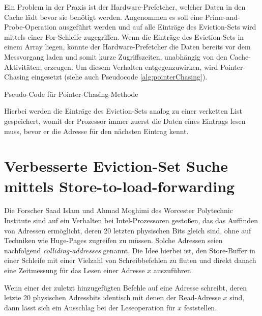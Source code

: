 Ein Problem in der Praxis ist der Hardware-Prefetcher, welcher Daten in den Cache lädt bevor sie benötigt werden.
Angenommen es soll eine Prime-and-Probe-Operation ausgeführt werden und auf alle Einträge des Eviction-Sets wird mittels einer For-Schleife zugegriffen.
Wenn die Einträge des Eviction-Sets in einem Array liegen, könnte der Hardware-Prefetcher die Daten bereits vor dem Messvorgang laden und somit kurze Zugriffszeiten, unabhängig von den Cache-Aktivitäten, erzeugen.
Um diesem Verhalten entgegenzuwirken, wird Pointer-Chasing eingesetzt (siehe auch Pseudocode \ref{alg:pointerChasing}).

\begin{algorithm}[h]
\DontPrintSemicolon
\caption{Pseudo-Code für Pointer-Chasing-Methode}
\label{alg:pointerChasing}

\end{algorithm}

Hierbei werden die Einträge des Eviction-Sets analog zu einer verketten List gespeichert, womit der Prozessor immer zuerst die Daten eines Eintrags lesen muss, bevor er die Adresse für den nächsten Eintrag kennt.

\section{Verbesserte Eviction-Set Suche mittels Store-to-load-forwarding}
\label{StoreFor}

Die Forscher Saad Islam und Ahmad Moghimi des Worcester Polytechnic Institute sind auf ein Verhalten bei Intel-Prozessoren gestoßen, das das Auffinden von Adressen ermöglicht, deren 20 letzten physischen Bits gleich sind, ohne auf Techniken wie Huge-Pages zugreifen zu müssen.
Solche Adressen seien nachfolgend \textit{colliding-addresses} genannt.
Die Idee hierbei ist, den Store-Buffer in einer Schleife mit einer Vielzahl von Schreibbefehlen zu fluten und direkt danach eine Zeitmessung für das Lesen einer Adresse $x$ auszuführen.

Wenn einer der zuletzt hinzugefügten Befehle auf eine Adresse schreibt, deren letzte 20 physischen Adressbits identisch mit denen der Read-Adresse $x$ sind, dann lässt sich ein Ausschlag bei der Leseoperation für $x$ feststellen.

